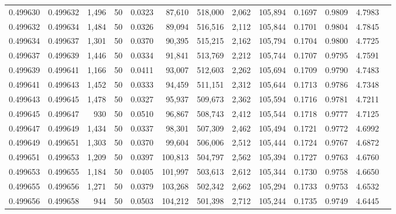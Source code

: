 \begin{tabular}{rrrrrrrrrrrrr}
0.499630 & 0.499632 & 1,496 &  50 &                                     0.0323 &  87,610 & 518,000 &   2,062 & 105,894 & 0.1697 & 0.9809 & 4.7983 \\
0.499632 & 0.499634 & 1,484 &  50 &                                     0.0326 &  89,094 & 516,516 &   2,112 & 105,844 & 0.1701 & 0.9804 & 4.7845 \\
0.499634 & 0.499637 & 1,301 &  50 &                                     0.0370 &  90,395 & 515,215 &   2,162 & 105,794 & 0.1704 & 0.9800 & 4.7725 \\
0.499637 & 0.499639 & 1,446 &  50 &                                     0.0334 &  91,841 & 513,769 &   2,212 & 105,744 & 0.1707 & 0.9795 & 4.7591 \\
0.499639 & 0.499641 & 1,166 &  50 &                                     0.0411 &  93,007 & 512,603 &   2,262 & 105,694 & 0.1709 & 0.9790 & 4.7483 \\
0.499641 & 0.499643 & 1,452 &  50 &                                     0.0333 &  94,459 & 511,151 &   2,312 & 105,644 & 0.1713 & 0.9786 & 4.7348 \\
0.499643 & 0.499645 & 1,478 &  50 &                                     0.0327 &  95,937 & 509,673 &   2,362 & 105,594 & 0.1716 & 0.9781 & 4.7211 \\
0.499645 & 0.499647 &   930 &  50 &                                     0.0510 &  96,867 & 508,743 &   2,412 & 105,544 & 0.1718 & 0.9777 & 4.7125 \\
0.499647 & 0.499649 & 1,434 &  50 &                                     0.0337 &  98,301 & 507,309 &   2,462 & 105,494 & 0.1721 & 0.9772 & 4.6992 \\
0.499649 & 0.499651 & 1,303 &  50 &                                     0.0370 &  99,604 & 506,006 &   2,512 & 105,444 & 0.1724 & 0.9767 & 4.6872 \\
0.499651 & 0.499653 & 1,209 &  50 &                                     0.0397 & 100,813 & 504,797 &   2,562 & 105,394 & 0.1727 & 0.9763 & 4.6760 \\
0.499653 & 0.499655 & 1,184 &  50 &                                     0.0405 & 101,997 & 503,613 &   2,612 & 105,344 & 0.1730 & 0.9758 & 4.6650 \\
0.499655 & 0.499656 & 1,271 &  50 &                                     0.0379 & 103,268 & 502,342 &   2,662 & 105,294 & 0.1733 & 0.9753 & 4.6532 \\
0.499656 & 0.499658 &   944 &  50 &                                     0.0503 & 104,212 & 501,398 &   2,712 & 105,244 & 0.1735 & 0.9749 & 4.6445 \\

\end{tabular}
